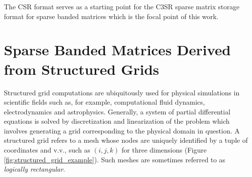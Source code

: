    The CSR format serves as a starting point for the C3SR sparse matrix storage format for sparse banded matrices which
    is the focal point of this work.

  \section{Sparse Banded Matrices Derived from Structured Grids} \label{subsec:structured-grid-matrices}

    Structured grid computations are ubiquitously used for physical simulations in scientific fields such as, for
    example, computational fluid dynamics, electrodynamics and astrophysics. Generally, a system of partial differential
    equations is solved by discretization and linearization of the problem which involves generating a grid
    corresponding to the physical domain in question. A structured grid refers to a mesh whose nodes are uniquely
    identified by a tuple of coordinates and v.v., such as $(i, j, k)$ for three dimensions (Figure
    \ref{fig:structured_grid_example}). Such meshes are sometimes referred to as \emph{logically rectangular}.

